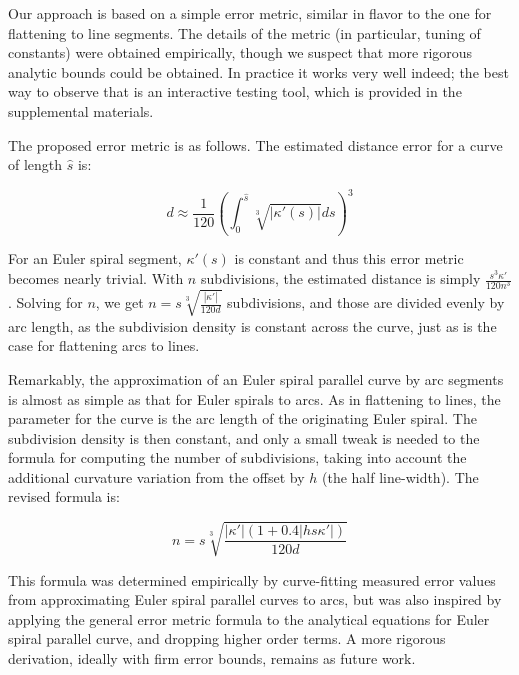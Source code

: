 \documentclass[sigconf, nonacm]{acmart}
\begin{document}

Our approach is based on a simple error metric, similar in flavor to the one for flattening to line segments. The details of the metric (in particular, tuning of constants) were obtained empirically, though we suspect that more rigorous analytic bounds could be obtained. In practice it works very well indeed; the best way to observe that is an interactive testing tool, which is provided in the supplemental materials.

The proposed error metric is as follows. The estimated distance error for a curve of length $\hat{s}$ is:

\[
    d \approx \frac{1}{120}\left(\int_0^{\hat{s}} \sqrt[3]{|\kappa'(s)|}ds \right)^3
\]

For an Euler spiral segment, $\kappa'(s)$ is constant and thus this error metric becomes nearly trivial. With $n$ subdivisions, the estimated distance is simply $\frac{s^3\kappa'}{120n^3}$. Solving for $n$, we get $n = s\sqrt[3]{\frac{|\kappa'|}{120d}}$ subdivisions, and those are divided evenly by arc length, as the subdivision density is constant across the curve, just as is the case for flattening arcs to lines.

Remarkably, the approximation of an Euler spiral parallel curve by arc segments is almost as simple as that for Euler spirals to arcs. As in flattening to lines, the parameter for the curve is the arc length of the originating Euler spiral. The subdivision density is then constant, and only a small tweak is needed to the formula for computing the number of subdivisions, taking into account the additional curvature variation from the offset by $h$ (the half line-width). The revised formula is:

\[
    n = s\sqrt[3]{\frac{|\kappa'|(1+0.4|hs\kappa'|)}{120d}}
\]

This formula was determined empirically by curve-fitting measured error values from approximating Euler spiral parallel curves to arcs, but was also inspired by applying the general error metric formula to the analytical equations for Euler spiral parallel curve, and dropping higher order terms. A more rigorous derivation, ideally with firm error bounds, remains as future work.
\end{document}
